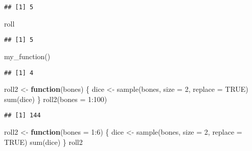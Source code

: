 \documentclass[
]{article}
\newenvironment{Shaded}{\begin{snugshade}}{\end{snugshade}}
\newcommand{\AttributeTok}[1]{\textcolor[rgb]{0.77,0.63,0.00}{#1}}
\newcommand{\ConstantTok}[1]{\textcolor[rgb]{0.00,0.00,0.00}{#1}}
\newcommand{\ControlFlowTok}[1]{\textcolor[rgb]{0.13,0.29,0.53}{\textbf{#1}}}
\newcommand{\DecValTok}[1]{\textcolor[rgb]{0.00,0.00,0.81}{#1}}
\newcommand{\FunctionTok}[1]{\textcolor[rgb]{0.00,0.00,0.00}{#1}}
\newcommand{\NormalTok}[1]{#1}
\newcommand{\OtherTok}[1]{\textcolor[rgb]{0.56,0.35,0.01}{#1}}
\newcommand{\SpecialCharTok}[1]{\textcolor[rgb]{0.00,0.00,0.00}{#1}}
\begin{document}
\begin{verbatim}
## [1] 5
\end{verbatim}

\begin{Shaded}
\begin{Highlighting}[]
\NormalTok{roll}
\end{Highlighting}
\end{Shaded}

\begin{verbatim}
## [1] 5
\end{verbatim}

\begin{Shaded}
\begin{Highlighting}[]
\FunctionTok{my\_function}\NormalTok{()}
\end{Highlighting}
\end{Shaded}

\begin{verbatim}
## [1] 4
\end{verbatim}

\begin{Shaded}
\begin{Highlighting}[]
\NormalTok{roll2 }\OtherTok{\textless{}{-}} \ControlFlowTok{function}\NormalTok{(bones) \{}
\NormalTok{  dice }\OtherTok{\textless{}{-}} \FunctionTok{sample}\NormalTok{(bones, }\AttributeTok{size =} \DecValTok{2}\NormalTok{, }\AttributeTok{replace =} \ConstantTok{TRUE}\NormalTok{)}
  \FunctionTok{sum}\NormalTok{(dice)}
\NormalTok{\}}
\FunctionTok{roll2}\NormalTok{(}\AttributeTok{bones =} \DecValTok{1}\SpecialCharTok{:}\DecValTok{100}\NormalTok{)}
\end{Highlighting}
\end{Shaded}

\begin{verbatim}
## [1] 144
\end{verbatim}

\begin{Shaded}
\begin{Highlighting}[]
\NormalTok{roll2 }\OtherTok{\textless{}{-}} \ControlFlowTok{function}\NormalTok{(}\AttributeTok{bones =} \DecValTok{1}\SpecialCharTok{:}\DecValTok{6}\NormalTok{) \{}
\NormalTok{  dice }\OtherTok{\textless{}{-}} \FunctionTok{sample}\NormalTok{(bones, }\AttributeTok{size =} \DecValTok{2}\NormalTok{, }\AttributeTok{replace =} \ConstantTok{TRUE}\NormalTok{)}
  \FunctionTok{sum}\NormalTok{(dice)}
\NormalTok{\}}
\NormalTok{roll2}
\end{Highlighting}
\end{Shaded}
\end{document}
